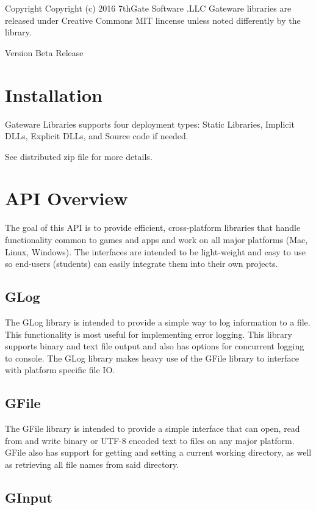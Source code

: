 \begin{DoxyCopyright}{Copyright}
Copyright (c) 2016 7th\+Gate Software .L\+LC  Gateware libraries are released under Creative Commons M\+IT lincense unless noted differently by the library. 
\end{DoxyCopyright}
\begin{DoxyVersion}{Version}
Beta Release
\end{DoxyVersion}
\hypertarget{index_Install}{}\section{Installation}\label{index_Install}
Gateware Libraries supports four deployment types\+: Static Libraries, Implicit D\+L\+Ls, Explicit D\+L\+Ls, and Source code if needed.

See distributed zip file for more details.\hypertarget{index_API}{}\section{A\+P\+I Overview}\label{index_API}
The goal of this A\+PI is to provide efficient, cross-\/platform libraries that handle functionality common to games and apps and work on all major platforms (Mac, Linux, Windows). The interfaces are intended to be light-\/weight and easy to use so end-\/users (students) can easily integrate them into their own projects.\hypertarget{index_APIGLog}{}\subsection{G\+Log}\label{index_APIGLog}
The G\+Log library is intended to provide a simple way to log information to a file. This functionality is most useful for implementing error logging. This library supports binary and text file output and also has options for concurrent logging to console. The G\+Log library makes heavy use of the G\+File library to interface with platform specific file IO.\hypertarget{index_APIGFile}{}\subsection{G\+File}\label{index_APIGFile}
The G\+File library is intended to provide a simple interface that can open, read from and write binary or U\+T\+F-\/8 encoded text to files on any major platform. G\+File also has support for getting and setting a current working directory, as well as retrieving all file names from said directory.\hypertarget{index_APIGInput}{}\subsection{G\+Input}\label{index_APIGInput}
